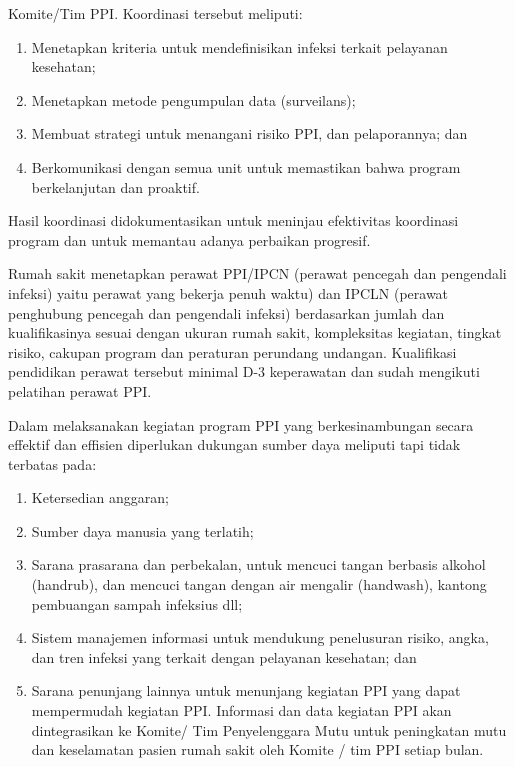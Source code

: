 \documentclass[
]{book}
\providecommand{\tightlist}{%
  \setlength{\itemsep}{0pt}\setlength{\parskip}{0pt}}
\begin{document}
Komite/Tim PPI. Koordinasi tersebut meliputi:

\begin{enumerate}
\def\labelenumi{\alph{enumi}.}
\tightlist
\item
  Menetapkan kriteria untuk mendefinisikan infeksi terkait pelayanan kesehatan;
\item
  Menetapkan metode pengumpulan data (surveilans);
\item
  Membuat strategi untuk menangani risiko PPI, dan pelaporannya; dan
\item
  Berkomunikasi dengan semua unit untuk memastikan bahwa program berkelanjutan dan proaktif.
\end{enumerate}

Hasil koordinasi didokumentasikan untuk meninjau efektivitas koordinasi program dan untuk memantau adanya perbaikan progresif.

Rumah sakit menetapkan perawat PPI/IPCN (perawat pencegah dan pengendali infeksi) yaitu perawat yang bekerja penuh waktu) dan IPCLN (perawat penghubung pencegah dan pengendali infeksi) berdasarkan jumlah dan kualifikasinya sesuai dengan ukuran rumah sakit, kompleksitas kegiatan, tingkat risiko, cakupan program dan peraturan perundang undangan. Kualifikasi pendidikan perawat tersebut minimal D-3 keperawatan dan sudah mengikuti pelatihan perawat PPI.

Dalam melaksanakan kegiatan program PPI yang berkesinambungan secara effektif dan effisien diperlukan dukungan sumber daya meliputi tapi tidak terbatas pada:

\begin{enumerate}
\def\labelenumi{\alph{enumi}.}
\tightlist
\item
  Ketersedian anggaran;
\item
  Sumber daya manusia yang terlatih;
\item
  Sarana prasarana dan perbekalan, untuk mencuci tangan berbasis alkohol (handrub), dan mencuci tangan dengan air mengalir (handwash), kantong pembuangan sampah infeksius dll;
\item
  Sistem manajemen informasi untuk mendukung penelusuran risiko, angka, dan tren infeksi yang terkait dengan pelayanan kesehatan; dan
\item
  Sarana penunjang lainnya untuk menunjang kegiatan PPI yang dapat mempermudah kegiatan PPI.
  Informasi dan data kegiatan PPI akan dintegrasikan ke Komite/ Tim Penyelenggara Mutu untuk peningkatan mutu dan keselamatan pasien rumah sakit oleh Komite / tim PPI setiap bulan.
\end{enumerate}
\end{document}
